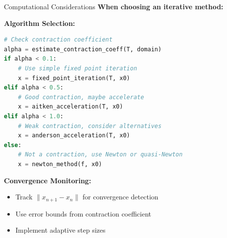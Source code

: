 \documentclass[aspectratio=169,10pt]{beamer}
\begin{document}
\begin{frame}[fragile]{Computational Considerations}
    \textbf{When choosing an iterative method:}

    \vspace{0.3cm}
    \textbf{Algorithm Selection:}
    \begin{lstlisting}[language=Python]
# Check contraction coefficient
alpha = estimate_contraction_coeff(T, domain)
if alpha < 0.1:
    # Use simple fixed point iteration
    x = fixed_point_iteration(T, x0)
elif alpha < 0.5:
    # Good contraction, maybe accelerate
    x = aitken_acceleration(T, x0)
elif alpha < 1.0:
    # Weak contraction, consider alternatives
    x = anderson_acceleration(T, x0)
else:
    # Not a contraction, use Newton or quasi-Newton
    x = newton_method(f, x0)
    \end{lstlisting}

    \vspace{0.3cm}
    \textbf{Convergence Monitoring:}
    \begin{itemize}
        \item Track $\|x_{n+1} - x_n\|$ for convergence detection
        \item Use error bounds from contraction coefficient
        \item Implement adaptive step sizes
    \end{itemize}
\end{frame}
\end{document}

